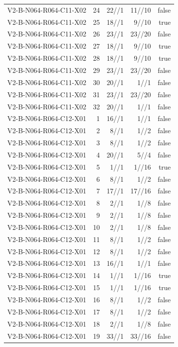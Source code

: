 {\begin{longtable}{lrrrr}
V2-B-N064-R064-C11-X02 & 24 & 22//1 & 11//10 & false \\
V2-B-N064-R064-C11-X02 & 25 & 18//1 & 9//10 & true \\
V2-B-N064-R064-C11-X02 & 26 & 23//1 & 23//20 & false \\
V2-B-N064-R064-C11-X02 & 27 & 18//1 & 9//10 & true \\
V2-B-N064-R064-C11-X02 & 28 & 18//1 & 9//10 & true \\
V2-B-N064-R064-C11-X02 & 29 & 23//1 & 23//20 & false \\
V2-B-N064-R064-C11-X02 & 30 & 20//1 & 1//1 & false \\
V2-B-N064-R064-C11-X02 & 31 & 23//1 & 23//20 & false \\
V2-B-N064-R064-C11-X02 & 32 & 20//1 & 1//1 & false \\
V2-B-N064-R064-C12-X01 & 1 & 16//1 & 1//1 & false \\
V2-B-N064-R064-C12-X01 & 2 & 8//1 & 1//2 & false \\
V2-B-N064-R064-C12-X01 & 3 & 8//1 & 1//2 & false \\
V2-B-N064-R064-C12-X01 & 4 & 20//1 & 5//4 & false \\
V2-B-N064-R064-C12-X01 & 5 & 1//1 & 1//16 & true \\
V2-B-N064-R064-C12-X01 & 6 & 8//1 & 1//2 & false \\
V2-B-N064-R064-C12-X01 & 7 & 17//1 & 17//16 & false \\
V2-B-N064-R064-C12-X01 & 8 & 2//1 & 1//8 & false \\
V2-B-N064-R064-C12-X01 & 9 & 2//1 & 1//8 & false \\
V2-B-N064-R064-C12-X01 & 10 & 2//1 & 1//8 & false \\
V2-B-N064-R064-C12-X01 & 11 & 8//1 & 1//2 & false \\
V2-B-N064-R064-C12-X01 & 12 & 8//1 & 1//2 & false \\
V2-B-N064-R064-C12-X01 & 13 & 16//1 & 1//1 & false \\
V2-B-N064-R064-C12-X01 & 14 & 1//1 & 1//16 & true \\
V2-B-N064-R064-C12-X01 & 15 & 1//1 & 1//16 & true \\
V2-B-N064-R064-C12-X01 & 16 & 8//1 & 1//2 & false \\
V2-B-N064-R064-C12-X01 & 17 & 8//1 & 1//2 & false \\
V2-B-N064-R064-C12-X01 & 18 & 2//1 & 1//8 & false \\
V2-B-N064-R064-C12-X01 & 19 & 33//1 & 33//16 & false \\

\end{longtable}}
